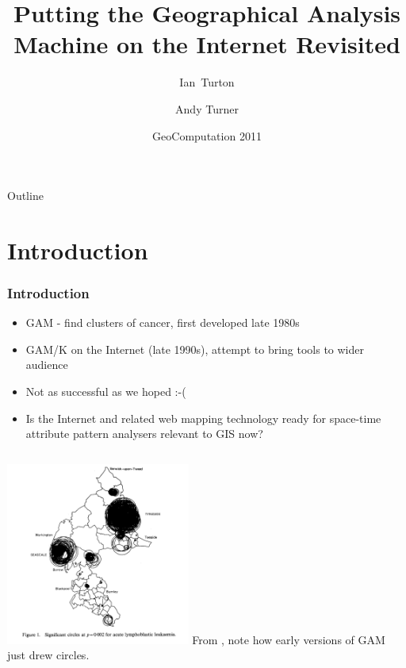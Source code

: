 \documentclass{beamer}
\title[GAM Revisited] %
{Putting the Geographical Analysis Machine on the Internet Revisited}
\author[Turton, Turner] %
{Ian~Turton\inst{1} \and Andy Turner\inst{2}}
\institute[ ] %
{
  \inst{1}%
Independent Researcher\\
 ijturton@gmail.com
  \and
  \inst{2}%
  Centre for Computational Geography\\
  University of Leeds\\
  A.G.D.Turner@leeds.ac.uk}
\date[ ] %
{GeoComputation 2011}
\begin{document}
\begin{frame}
  \titlepage
\end{frame}

\begin{frame}{Outline}
  \tableofcontents
\end{frame}


\section{Introduction}
\begin{frame}[t]
\frametitle{Introduction}
\begin{itemize}
\item GAM - find clusters of cancer, first developed late 1980s
\item GAM/K on the Internet (late 1990s), attempt to bring tools to wider audience
\item Not as successful as we hoped :-(
\item Is the Internet and related web mapping technology ready for space-time attribute pattern analysers relevant to GIS now?
\end{itemize}
\end{frame}
\begin{frame}
\begin{columns}
\includegraphics[height=6.0cm]{first_gam.png}
From \citet{citeulike:5207314}, note how early versions of GAM just drew circles.
\end{columns}
\end{frame}
\end{document}
